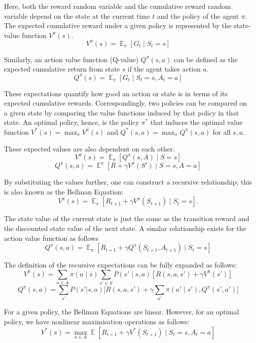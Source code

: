 \documentclass[11pt,a4paper]{report}
\DeclareMathOperator{\EX}{\mathbb{E}}
\begin{document}
Here, both the reward random variable and the cumulative reward random variable depend on the state at the current time $t$ and the policy of the agent $\pi$. The expected cumulative reward under a given policy is represented by the state-value function $V^{\pi}(s)$.
\[
  V^{\pi}(s) = \EX_{\pi}[G_t \mid S_t = s]
\] \par

Similarly, an action value function (Q-value) $Q^\pi (s, a)$ can be defined as the expected cumulative return from state $s$ if the agent takes action $a$. 
\[
  Q^{\pi}(s) = \EX_{\pi}[G_t \mid S_t = s, A_t = a]
\] \par

These expectations quantify how good an action or state is in terms of its expected cumulative rewards. Correspondingly, two policies can be compared on a given state by comparing the value functions induced by that policy in that state. An optimal policy, hence, is the policy $\pi^*$ that induces the optimal value function $V^*(s) = \max_\pi V^\pi(s)$ and $Q^*(s, a) = \max_\pi Q^\pi(s, a)$ for all $s, a$. \par

These expected values are also dependent on each other.
\[
  V^\pi(s) = \EX_{\pi}[Q^\pi(s, A) \mid S = s]
\]
\[
  Q^\pi(s, a) = \EX^\pi[R + \gamma V^\pi(S') \mid S = s, A = a ]
\] \par

By substituting the values further, one can construct a recursive relationship; this is also known as the Bellman Equation:
\[
  V^\pi(s) = \EX_{\pi}[ R_{t+1} + \gamma V^\pi(S_{t+1}) \mid S_{t}= s].
\] \par

The state value of the current state is just the same as the transition reward and the discounted state value of the next state. A similar relationship exists for the action value function as follows  
\[
  Q^\pi(s, a) = \EX_{\pi}[ R_{t+1} + \gamma Q^\pi(S_{t+1}, A_{t+1}) \mid S_{t}= s]
\] \par

The definition of the recursive expectations can be fully expanded as follows:
\[
V^{\pi}(s) = \sum_{a \in A} \pi(a \mid s) \sum_{s' \in S} P(s' \mid s, a) \left[ R(s, a, s') + \gamma V^{\pi}(s') \right]
\]
\[
Q^\pi(s,a) = \sum_{s'}P(s'|s,a)\big[ R(s,a,s') + \gamma \sum_{a'}\pi(a'\mid s'),Q^\pi(s',a')\big]
\] \par

For a given policy, the Bellman Equations are linear. However, for an optimal policy, we have nonlinear maximisation operations as follows: 
\[
  V^*(s) = \max_{a \in A}\EX[ R_{t+1} + \gamma V^*(S_{t+1}) \mid S_{t}= s, A_t = a]
\] \par
\end{document}
